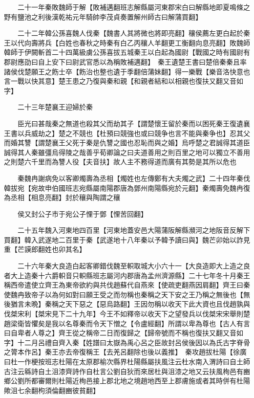 　　二十一年秦敗魏師于解【敗補邁翻班志解縣屬河東郡宋白曰解縣地即夏鳴條之野有鹽池之利後漢乾祐元年騎帥李茂貞奏置解州師古曰解蒲買翻】

　　二十二年韓公孫喜魏人伐秦【魏書人其將微也將即亮翻】穰侯薦左更白起於秦王以代向壽將兵【白姓也春秋之時秦有白乙丙穰人羊翻更工衡翻向息亮翻】敗魏師韓師于伊闕斬首二十四萬級虜公孫喜拔五城秦王以白起為國尉【戰國之時有國尉有郡尉應劭曰自上安下曰尉武官悉以為稱敗補邁翻】　秦王遺楚王書曰楚倍秦秦且率諸侯伐楚願王之飭士卒【飭治也整也遺于季翻倍蒲妹翻】得一樂戰【樂音洛快意也言一戰以快其意】楚王患之乃復與秦和親【和親者結和以相親也復扶又翻又音如字】

　　二十三年楚襄王迎婦於秦

　　臣光曰甚哉秦之無道也殺其父而劫其子【謂楚懷王留於秦而以困死秦王復遺襄王書以兵威劫之】楚之不競也【杜預曰競強也或曰競争也言不能與秦争也】忍其父而婚其讐【謂楚襄王父死于秦是仇讐之國也忍恥而與之婚】烏呼楚之君誠得其道臣誠得其人秦雖彊烏得陵之哉善乎荀卿論之曰夫道善用之則百里之地可以獨立不善用之則楚六千里而為讐人役【夫音扶】故人主不務得道而廣有其勢是其所以危也

　　秦魏冉謝病免以客卿燭壽為丞相【燭姓也左傳鄭有大夫燭之武】二十四年秦伐韓拔宛【宛故申伯國班志宛縣屬南陽郡唐為鄧州南陽縣宛於元翻】秦燭壽免魏冉復為丞相【相息亮翻】封於穰與陶謂之穰

　　侯又封公子市于宛公子悝于鄧【悝苦回翻】

　　二十五年魏入河東地四百里【河東地蓋安邑大陽蒲阪解縣瀕河之地阪音反解下買翻】韓入武遂地二百里于秦【武遂地十八年秦以予韓予讀曰與】魏芒卯始以詐見重【芒謨郎翻姓也卯其名】

　　二十六年秦大良造白起客卿錯伐魏至軹取城大小六十一【大良造即大上造之良者大上造秦十六爵軹音只軹縣班志屬河内郡唐為孟州濟源縣】二十七年冬十月秦王稱西帝遣使立齊王為東帝欲約與共伐趙蘇代自燕來【使疏吏翻燕因肩翻】齊王曰秦使魏冉致帝子以為何如對曰願王受之而勿稱也秦稱之天下安之王乃稱之無後也【無後猶言未晩】秦稱之天下惡之【惡烏路翻】王因勿稱以收天下此大資也且伐趙孰與伐桀宋利【桀宋見下二十九年】今王不如釋帝以收天下之望發兵以伐桀宋宋舉則楚趙梁衛皆懼矣是我以名尊秦而令天下憎之【令盧經翻】所謂以卑為尊也【古人有言曰自卑者人尊之】齊王從之稱帝二日而復歸之【歸帝號而不稱也復扶又翻又音如字】十二月呂禮自齊入秦【姓譜曰太嶽為禹心呂之臣故封呂侯後因以為氏古字脊骨之膂本作呂】秦王亦去帝復稱王【去羌呂翻除也後以義推】　秦攻趙拔杜陽【徐廣曰杜一作梗按班志杜陽在太原郡榆次縣界杜陽縣屬扶風注云杜水南入渭詩曰自土師古注云緜詩自土沮漆齊詩作自杜言公劉自狄而來居杜與沮漆之地又云扶風栒邑有豳鄉公劉所都審爾則杜陽近栒邑接上郡北地之境趙地西至上郡膚施或者其時併有杜陽歟沮七余翻枸須倫翻豳彼貧翻】

